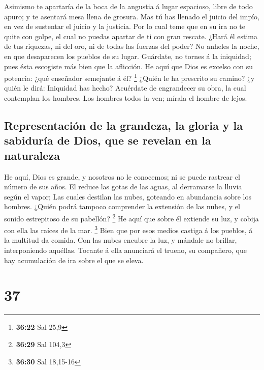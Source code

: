  Asimismo te apartaría de la boca de la angustia á lugar
espacioso, libre de todo apuro; y te asentará mesa llena de grosura.
 Mas tú has llenado el juicio del impío, en vez de
sustentar el juicio y la justicia.  Por lo cual teme que en
su ira no te quite con golpe, el cual no puedas apartar de ti con gran
rescate.  ¿Hará él estima de tus riquezas, ni del oro, ni
de todas las fuerzas del poder?  No anheles la noche, en
que desaparecen los pueblos de su lugar.  Guárdate, no
tornes á la iniquidad; pues ésta escogiste más bien que la aflicción.
 He aquí que Dios es excelso con su potencia: ¿qué
enseñador semejante á él? \footnote{\textbf{36:22} Sal 25,9}
 ¿Quién le ha prescrito su camino? ¿y quién le dirá:
Iniquidad has hecho?  Acuérdate de engrandecer su obra, la
cual contemplan los hombres.  Los hombres todos la ven;
mírala el hombre de lejos.

\hypertarget{representaciuxf3n-de-la-grandeza-la-gloria-y-la-sabiduruxeda-de-dios-que-se-revelan-en-la-naturaleza}{%
\subsection{Representación de la grandeza, la gloria y la sabiduría de
Dios, que se revelan en la
naturaleza}\label{representaciuxf3n-de-la-grandeza-la-gloria-y-la-sabiduruxeda-de-dios-que-se-revelan-en-la-naturaleza}}

 He aquí, Dios es grande, y nosotros no le conocemos; ni se
puede rastrear el número de sus años.  El reduce las gotas
de las aguas, al derramarse la lluvia según el vapor;  Las
cuales destilan las nubes, goteando en abundancia sobre los hombres.
 ¿Quién podrá tampoco comprender la extensión de las nubes,
y el sonido estrepitoso de su pabellón? \footnote{\textbf{36:29} Sal
  104,3}  He aquí que sobre él extiende su luz, y cobija
con ella las raíces de la mar. \footnote{\textbf{36:30} Sal 18,15-16}
 Bien que por esos medios castiga á los pueblos, á la
multitud da comida.  Con las nubes encubre la luz, y
mándale no brillar, interponiendo aquéllas.  Tocante á ella
anunciará el trueno, su compañero, que hay acumulación de ira sobre el
que se eleva.

\hypertarget{section-36}{%
\section{37}\label{section-36}}

